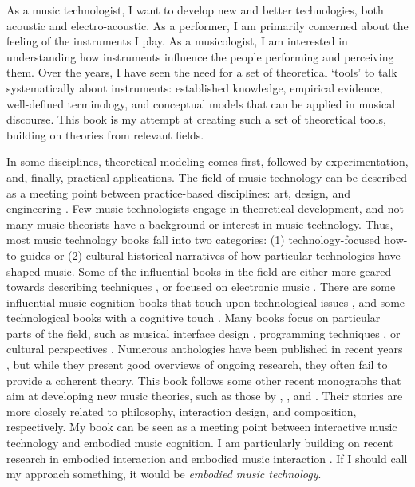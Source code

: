 As a music technologist, I want to develop new and better technologies, both acoustic and electro-acoustic. As a performer, I am primarily concerned about the feeling of the instruments I play. As a musicologist, I am interested in understanding how instruments influence the people performing and perceiving them. Over the years, I have seen the need for a set of theoretical `tools' to talk systematically about instruments: established knowledge, empirical evidence, well-defined terminology, and conceptual models that can be applied in musical discourse. This book is my attempt at creating such a set of theoretical tools, building on theories from relevant fields.

In some disciplines, theoretical modeling comes first, followed by experimentation, and, finally, practical applications. The field of music technology can be described as a meeting point between practice-based disciplines: art, design, and engineering \citep{wang_artful_2018}. Few music technologists engage in theoretical development, and not many music theorists have a background or interest in music technology. Thus, most music technology books fall into two categories: (1) technology-focused how-to guides or (2) cultural-historical narratives of how particular technologies have shaped music. Some of the influential books in the field are either more geared towards describing techniques \citep{roads_computer_1996}, or focused on electronic music \citep{chadabe_electric_1997,holmes_electronic_2002,collins_cambridge_2007}.
There are some influential music cognition books that touch upon technological issues \citep{leman_embodied_2008,leman_expressive_2016}, and some  technological books with a cognitive touch \citep{cook_real_2002}. Many books focus on particular parts of the field, such as musical interface design \citep{miranda_new_2006}, programming techniques \citep{boulanger_audio_2011}, or cultural perspectives \citep{butler_playing_2014}.
Numerous anthologies have been published in recent years \citep{bovermann_musical_2017,ruthmann_oxford_2017,holland_new_2019}, but while they present good overviews of ongoing research, they often fail to provide a coherent theory. This book follows some other recent monographs that aim at developing new music theories, such as those by \citet{de_souza_music_2017}, \citet{wang_artful_2018}, and \citet{magnusson_sonic_2019}. Their stories are more closely related to philosophy, interaction design, and composition, respectively. My book can be seen as a meeting point between interactive music technology and embodied music cognition. I am particularly building on recent research in embodied interaction \citep{dourish_where_2001,oneill_interactive_2008,streeck_embodied_2011} and embodied music interaction \citep{lesaffre_Routledge_2017}. If I should call my approach something, it would be \emph{embodied music technology}.


